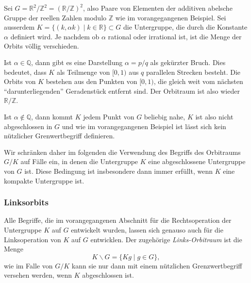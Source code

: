 \begin{beispiel}
Sei $G=\mathbb{R}^2/\mathbb{Z}^2 = (\mathbb{R}/\mathbb{Z})^2$,
also Paare von Elementen der additiven abelsche Gruppe der reellen
Zahlen modulo $\mathbb{Z}$ wie im vorangegangenen Beispiel.
Sei ausserdem $K=\{(k,\alpha k)\mid k\in\mathbb{R}\}\subset G$
die Untergruppe, die durch die Konstante $\alpha$ definiert wird.
Je nachdem ob $\alpha$ rational oder irrational ist, ist die Menge der
Orbits völlig verschieden.

Ist $\alpha\in\mathbb{Q}$, dann gibt es eine Darstellung $\alpha=p/q$
als gekürzter Bruch.
Dies bedeutet, dass $K$ als Teilmenge von $[0,1)$ aus $q$ parallelen
Strecken besteht.
Die Orbits von $K$ bestehen aus den Punkten von $[0,1)$, die gleich weit
vom nächsten ``darunterliegenden'' Geradenstück entfernt sind.
Der Orbitraum ist also wieder $\mathbb{R}/\mathbb{Z}$.

Ist $\alpha\not\in\mathbb{Q}$, dann kommt $K$ jedem Punkt von $G$ beliebig
nahe, $K$ ist also nicht abgeschlossen in $G$ und wie im vorangegangenen
Beispiel ist lässt sich kein nützlicher Grenwertbegriff definieren.
\end{beispiel}

Wir schränken daher im folgenden die Verwendung des Begriffs des
Orbitraums $G/K$ auf Fälle ein, in denen die Untergruppe $K$ eine
abgeschlossene Untergruppe von $G$ ist.
Diese Bedingung ist insbesondere dann immer erfüllt, wenn $K$ eine
kompakte Untergruppe ist.

%
%
\subsubsection{Linksorbits}
Alle Begriffe, die im vorangegangenen Abschnitt für die Rechtsoperation
der Untergruppe $K$ auf $G$ entwickelt wurden, lassen sich genauso
auch für die Linksoperation von $K$ auf $G$ entwicklen.
Der zugehörige {\em Links-Orbitraum} ist die Menge
\[
K\backslash G
=
\{ Kg \mid g\in G \},
\]
wie im Falle von $G/K$ kann sie nur dann mit einem nützlichen
Grenzwertbegriff versehen werden, wenn $K$ abgeschlossen ist.

